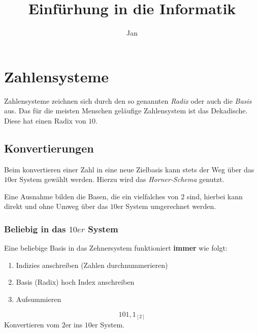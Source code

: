 \documentclass{article}
\title{Einfürhung in die Informatik} %
\author{Jan} %
\date{} %
\begin{document}
\maketitle %



\tableofcontents

\pagebreak


\section{Zahlensysteme}

Zahlensysteme zeichnen sich durch den so genannten \emph{Radix} oder auch die \emph{Basis} aus.
Das f\"ur die meisten Menschen geläufige Zahlensystem ist das Dekadische. Diese hat einen Radix von $10$.

\subsection{Konvertierungen}

Beim konvertieren einer Zahl in eine neue Zielbasis kann stets der Weg über das $10$er System gewählt werden.
Hierzu wird das \emph{Horner-Schema} genutzt.

Eine Ausnahme bilden die Basen, die ein vielfalches von $2$ sind, hierbei kann direkt und ohne Umweg über das $10$er System umgerechnet werden.

\subsubsection{Beliebig in das $10er$ System}

Eine beliebige Basis in das Zehnersystem funktioniert \textbf{immer} wie folgt:

\begin{enumerate}[(1)]
    \item Indizies anschreiben (Zahlen durchnummerieren)
    \item Basis (Radix) hoch Index anschreiben
    \item Aufsummieren
\end{enumerate}

\begin{question}[]
    \begin{equation*}
        101,1_{[2]}
    \end{equation*}
    Konvertieren vom $2$er ins $10$er System.
\end{question}
\end{document}
